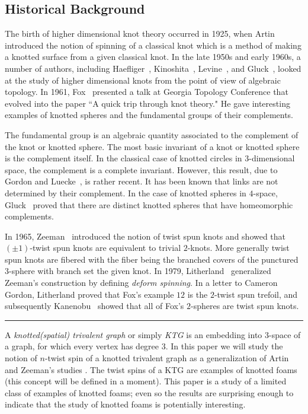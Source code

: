 \documentclass{amsart}
\theoremstyle{definition}
\theoremstyle{remark}
\numberwithin{equation}{section}
\begin{document}
\subsection{Historical Background} The birth of higher dimensional knot theory occurred in 
 1925,  when Artin~\cite{Art25} introduced the notion of spinning of a classical knot which is a method of making a knotted surface from a given classical knot. In the late 1950s and early 1960s, a number of authors, including Haefliger~\cite{Hae62}, Kinoshita~\cite{Kin60}, Levine~\cite{Lev65}, and Gluck~\cite{Glu62}, looked at the study of higher dimensional knots from the point of view of algebraic topology. In 1961, Fox~\cite{Fox61} presented a talk at Georgia Topology Conference that evolved into the paper ``A quick trip through knot theory." He gave interesting examples of knotted spheres and the fundamental groups of their complements.  
 
 The fundamental group is an algebraic quantity associated to the complement of the knot or knotted sphere. The most basic invariant of a knot or knotted sphere is the complement itself. In the classical case of knotted circles in $3$-dimensional space, the complement is a complete invariant. However, this result, due to Gordon and Luecke~\cite{Gor89}, is rather recent. It has been known that links are not determined by their complement. In the case of knotted spheres in $4$-space, Gluck~\cite{Glu62} proved that there are distinct knotted spheres that have homeomorphic complements.

In 1965, Zeeman~\cite{Zee65} introduced the notion of twist spun knots and showed that $(\pm1)$-twist spun knots are equivalent to trivial $2$-knots. More generally twist spun knots are fibered with the fiber being the branched covers of the punctured $3$-sphere with branch set the given knot. In 1979, Litherland~\cite{Lit79} generalized Zeeman's construction by defining  \emph{deform spinning}. In a letter to Cameron Gordon, Litherland proved that Fox's example $12$  is the $2$-twist spun trefoil, and subsequently Kanenobu~\cite{Kan83} showed that all of Fox's $2$-spheres are twist spun knots.


\begin{center}
\rule{2in}{0.01in}
\end{center}

A \emph{knotted(spatial) trivalent graph} or simply \emph{KTG} is an embedding into $3$-space of a graph, for which every vertex has degree $3$. In this paper we will study the notion of $n$-twist spin of a knotted trivalent graph as a generalization of Artin and Zeeman's studies \cite{Art25, Zee65}. The twist spins of a KTG are examples of knotted foams (this concept will be defined in a moment). This paper is a study of a limited class of examples of knotted foams; even so the results are surprising enough to indicate that the study of knotted foams is potentially interesting.
\end{document}
